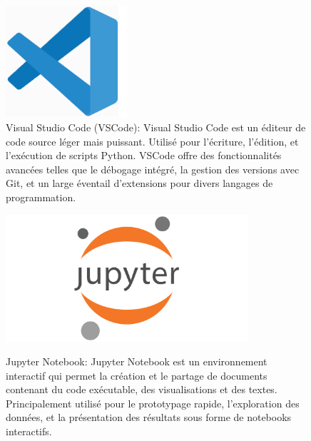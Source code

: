 \begin{figure}[h!]
	\centering
	\begin{minipage}[t]{0.46\textwidth}
		\centering
		\includegraphics[width=0.4\textwidth]{images/logoVSCODE} \\ %
		\caption[Logo VSCODE]{Visual Studio Code (VSCode): Visual Studio Code est un éditeur de code source léger mais puissant. Utilisé pour l'écriture, l'édition, et l'exécution de scripts Python. VSCode offre des fonctionnalités avancées telles que le débogage intégré, la gestion des versions avec Git, et un large éventail d'extensions pour divers langages de programmation.}
		\label{fig:vscode}
	\end{minipage}
	\hfill
	\begin{minipage}[t]{0.46\textwidth}
		\centering
		\includegraphics[width=0.8\textwidth]{images/logoJupyter} \\ %
		\caption[Logo Jupyter Notebook]{Jupyter Notebook: Jupyter Notebook est un environnement interactif qui permet la création et le partage de documents contenant du code exécutable, des visualisations et des textes. Principalement utilisé pour le prototypage rapide, l'exploration des données, et la présentation des résultats sous forme de notebooks interactifs.}
		\label{fig:jupyter}
	\end{minipage}
\end{figure}

\vspace{1em}

